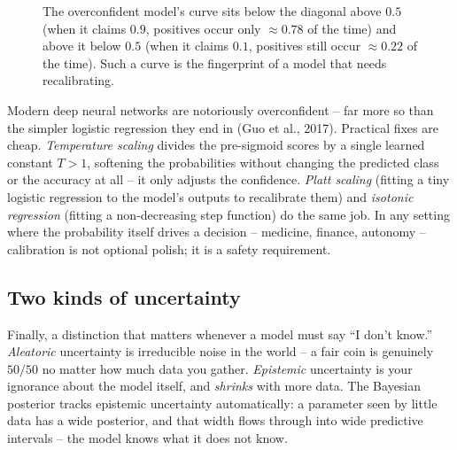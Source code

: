 \begin{figure}[H]
\centering
{}
\caption{The overconfident model's curve sits below the diagonal above $0.5$ (when it claims
$0.9$, positives occur only $\approx 0.78$ of the time) and above it below $0.5$ (when it claims $0.1$, positives still occur $\approx 0.22$ of the time). Such a curve is the
fingerprint of a model that needs recalibrating.}
\label{ch34:fig-calib}
\end{figure}

\begin{applicationbox}
Modern deep neural networks are notoriously overconfident -- far more so than the
simpler logistic regression they end in (Guo et al., 2017). Practical fixes are
cheap. \emph{Temperature scaling} divides the pre-sigmoid scores by a single
learned constant $T>1$, softening the probabilities without changing the
predicted class or the accuracy at all -- it only adjusts the confidence. \emph{Platt scaling} (fitting a tiny logistic regression to the model's outputs to recalibrate them) and \emph{isotonic regression} (fitting a non-decreasing step function) do the same job. In any setting where the probability itself
drives a decision -- medicine, finance, autonomy -- calibration is not optional
polish; it is a safety requirement.
\end{applicationbox}

\subsection{Two kinds of uncertainty}

Finally, a distinction that matters whenever a model must say ``I don't know.''
\emph{Aleatoric} uncertainty is irreducible noise in the world -- a fair coin is
genuinely $50/50$ no matter how much data you gather. \emph{Epistemic}
uncertainty is your ignorance about the model itself, and \emph{shrinks} with more
data. The Bayesian posterior tracks epistemic uncertainty automatically: a
parameter seen by little data has a wide posterior, and that width flows through
into wide predictive intervals -- the model knows what it does not know.

